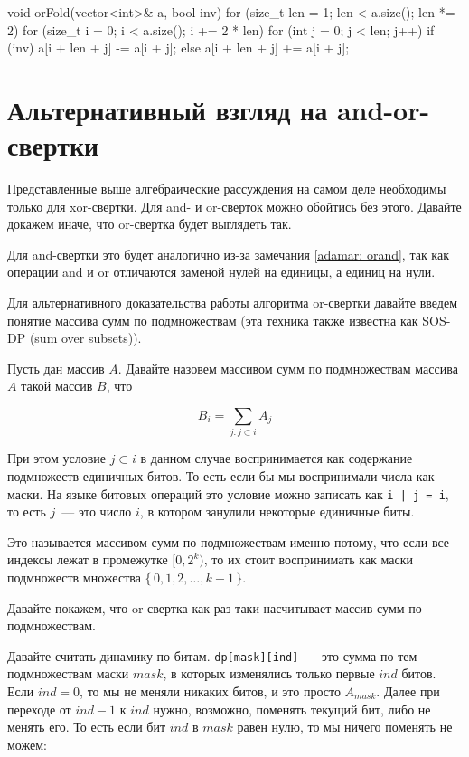 \begin{code}
void orFold(vector<int>& a, bool inv) {
    for (size_t len = 1; len < a.size(); len *= 2) {
        for (size_t i = 0; i < a.size(); i += 2 * len) {
            for (int j = 0; j < len; j++) {
                if (inv) {
                    a[i + len + j] -= a[i + j];
                } else {
                    a[i + len + j] += a[i + j];
                }
            }
        }
    }
}
\end{code}

\section{Альтернативный взгляд на and-or-свертки}

Представленные выше алгебраические рассуждения на самом деле необходимы только для xor-свертки. Для and- и or-сверток можно обойтись без этого. Давайте докажем иначе, что or-свертка будет выглядеть так.

Для and-свертки это будет аналогично из-за замечания \ref{adamar: orand}, так как операции and и or отличаются заменой нулей на единицы, а единиц на нули.

Для альтернативного доказательства работы алгоритма or-свертки давайте введем понятие массива сумм по подмножествам (эта техника также известна как SOS-DP (sum over subsets)).

\begin{definition}
    Пусть дан массив $A$. Давайте назовем массивом сумм по подмножествам массива $A$ такой массив $B$, что

    $$ B_i = \sum_{j : j \subset i} A_j$$

    При этом условие $j \subset i$ в данном случае воспринимается как содержание подмножеств единичных битов. То есть если бы мы воспринимали числа как маски. На языке битовых операций это условие можно записать как \verb+i | j = i+, то есть $j$~--- это число $i$, в котором занулили некоторые единичные биты.
\end{definition}

Это называется массивом сумм по подмножествам именно потому, что если все индексы лежат в промежутке $[0, 2^k)$, то их стоит воспринимать как маски подмножеств множества $\{\, 0, 1, 2, \ldots, k - 1 \,\}$.

Давайте покажем, что or-свертка как раз таки насчитывает массив сумм по подмножествам.

Давайте считать динамику по битам. \verb+dp[mask][ind]+~--- это сумма по тем подмножествам маски $mask$, в которых изменялись только первые $ind$ битов. Если $ind = 0$, то мы не меняли никаких битов, и это просто $A_{mask}$. Далее при переходе от $ind - 1$ к $ind$ нужно, возможно, поменять текущий бит, либо не менять его. То есть если бит $ind$ в $mask$ равен нулю, то мы ничего поменять не можем:

